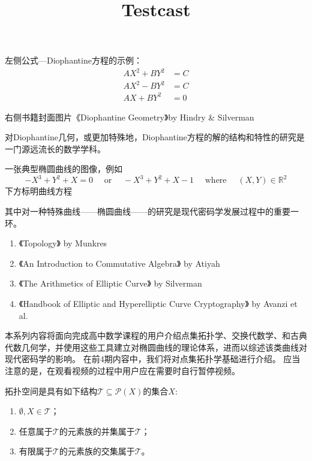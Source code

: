 \documentclass[10pt]{article}
\title{Testcast}
\author{}
\begin{document}
\maketitle
\begin{abstract}
\end{abstract}
\renewcommand{\setminus}{\mathbin{\backslash}}

\begin{tcolorbox}[colback=yellow]
左侧公式---Diophantine方程的示例：
\begin{align*} A X^{2}+B Y^{2} &=C \\ A X^{2}-B Y^{2} &=C \\ A X+B Y^{2} &=0 \end{align*}

右侧书籍封面图片《Diophantine Geometry》by Hindry \& Silverman
\end{tcolorbox}

对Diophantine几何，或更加特殊地，Diophantine方程的解的结构和特性的研究是一门源远流长的数学学科。

\begin{tcolorbox}[colback=yellow]
一张典型椭圆曲线的图像，例如
$$
-X^3+Y^2+X=0\quad\text{ or }\quad -X^3+Y^2+X-1\quad\text{ where }\quad (X,Y)\in\mathbb{R}^2
$$
下方标明曲线方程
\end{tcolorbox}

其中对一种特殊曲线——椭圆曲线——的研究是现代密码学发展过程中的重要一环。

\begin{tcolorbox}[colback=yellow]
\begin{enumerate}
\item 《Topology》 by Munkres
\item 《An Introduction to Commutative Algebra》 by Atiyah
\item 《The Arithmetics of Elliptic Curve》 by Silverman
\item 《Handbook of Elliptic and Hyperelliptic Curve Cryptography》 by Avanzi et al.
\end{enumerate}
\end{tcolorbox}

本系列内容将面向完成高中数学课程的用户介绍点集拓扑学、交换代数学、和古典代数几何学，并使用这些工具建立对椭圆曲线的理论体系，进而以综述该类曲线对现代密码学的影响。
在前4期内容中，我们将对点集拓扑学基础进行介绍。
应当注意的是，在观看视频的过程中用户应在需要时自行暂停视频。

\begin{tcolorbox}[colback=gray]
拓扑空间是具有如下结构$\mathcal{T}\subseteq\mathcal{P}(X)$的集合$X$:
\begin{enumerate}
\item $\emptyset,X\in\mathcal{T}$；
\item 任意属于$\mathcal{T}$的元素族的并集属于$\mathcal{T}$；
\item 有限属于$\mathcal{T}$的元素族的交集属于$\mathcal{T}$。
\end{enumerate}
\end{tcolorbox}
\end{document}
